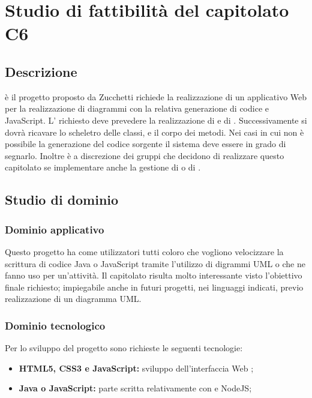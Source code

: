 \documentclass[../StudioDiFattibilita.tex]{subfiles}
\begin{document}
\section{Studio di fattibilità del capitolato C6}
	\subsection{Descrizione}
	 è il progetto proposto da Zucchetti richiede la realizzazione di un applicativo Web per la realizzazione di diagrammi  con la relativa generazione di codice  e JavaScript. L' richiesto deve prevedere la realizzazione di  e di . Successivamente si dovrà ricavare lo scheletro delle classi, e il corpo dei metodi. Nei casi in cui non è possibile la generazione del codice sorgente il sistema deve essere in grado di segnarlo. Inoltre è a discrezione dei gruppi che decidono di realizzare questo capitolato se implementare anche la gestione di  o di .
	
	\subsection{Studio di dominio}	
	  	\subsubsection{Dominio applicativo}
		Questo progetto ha come utilizzatori tutti coloro che vogliono velocizzare la scrittura di codice Java o JavaScript tramite l'utilizzo di digrammi UML o che ne fanno uso per un'attività. Il capitolato risulta molto interessante visto l'obiettivo finale richiesto; impiegabile anche in futuri progetti, nei linguaggi indicati, previo realizzazione di un diagramma UML.
		
	 	\subsubsection{Dominio tecnologico}
		Per lo sviluppo del progetto sono richieste le seguenti tecnologie:
       		\begin{itemize}
           		\item\textbf{HTML5, CSS3 e JavaScript:} sviluppo dell'interfaccia Web ;
            	\item\textbf{Java o JavaScript:} parte  scritta relativamente con  e NodeJS;
      		\end{itemize}
		
\end{document}
